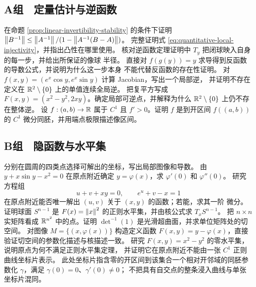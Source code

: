 \subsection*{A组　定量估计与逆函数}
\begin{enumerate}[label=\textbf{\thechapter.\arabic*.}]
 在命题 \ref{prop:linear-invertibility-stability} 的条件下证明
 $\left\lVert B^{-1}\right\rVert\le\left\lVert A^{-1}\right\rVert/(1-\left\lVert A^{-1}(B-A)\right\rVert)$。
 完整证明式 \eqref{eq:quantitative-local-injectivity}，并指出凸性在哪里使用。
 核对逆函数定理证明中 $T_y$ 把闭球映入自身的每一步，并给出所保证的像球
 半径。
 直接对 $f(g(y))=y$ 求导得到反函数的导数公式，并说明为什么这一步本身
 不能代替反函数的存在性证明。
 对 $f(x,y)=(e^x\cos y,e^x\sin y)$ 计算 Jacobian，写出一个局部逆，
 并证明不存在定义在 $\mathbb{R}^2\setminus\{0\}$ 上的单值连续全局逆。
 把复平方写成 $F(x,y)=(x^2-y^2,2xy)$。确定局部可逆点，并解释为什么
 $\mathbb{R}^2\setminus\{0\}$ 上仍不存在整体逆。
 设 $f:(a,b)\to\mathbb{R}$ 属于 $C^1$ 且 $f'>0$。证明 $f$ 是到开区间
 $f((a,b))$ 的 $C^1$ 微分同胚，并用端点极限描述像区间。
\end{enumerate}

\subsection*{B组　隐函数与水平集}
\begin{enumerate}[label=\textbf{\thechapter.\arabic*.},resume]
 分别在圆周的四类点选择可解出的坐标，写出局部图像和导数。
 由 $y+x\sin y-x^2=0$ 在原点附近确定 $y=\varphi(x)$，求
 $\varphi'(0)$ 和 $\varphi''(0)$。
 研究方程组
 \[
  u+v+xy=0,\qquad e^u+v-x=1
 \]
 在原点附近能否唯一解出 $(u,v)$ 关于 $(x,y)$ 的函数；若能，求其一阶
 微分。
 证明球面 $S^{n-1}$ 是 $F(x)=\left\lVert x\right\rVert^2$ 的正则水平集，并由核公式求
 $T_xS^{n-1}$。
 把 $n\times n$ 实矩阵看成 $\mathbb{R}^{n^2}$ 中的点。证明
 $\det^{-1}(1)$ 是光滑超曲面，并求单位矩阵处的切空间。
 对图像 $M=\{(x,\varphi(x))\}$ 构造定义函数
 $F(x,y)=y-\varphi(x)$，直接验证切空间的参数化描述与核描述一致。
 研究 $F(x,y)=x^2-y^2$ 的零水平集，说明原点为何不满足正则水平集定理，
 并证明它在原点附近不能由一张 $C^1$ 正则曲线坐标片表示。
 此处坐标片指含零的开区间到该集合一个相对开邻域的同胚参数化
 \(\gamma\)，满足 \(\gamma(0)=0\)、\(\gamma'(0)\ne0\)；
 不把具有自交点的整条浸入曲线与单张坐标片混同。
\end{enumerate}

